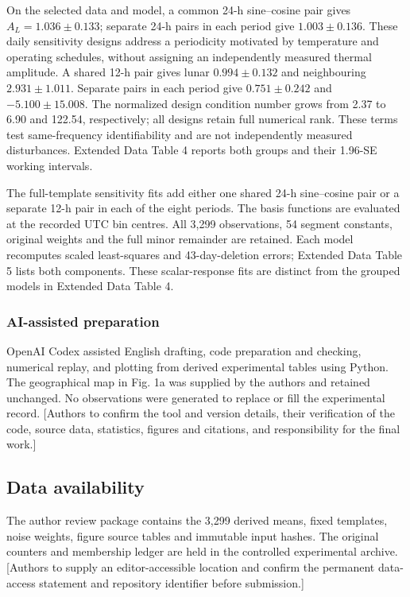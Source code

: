 \documentclass[
  12pt,
  a4paper,
]{article}
\begin{document}
On the selected data and model, a common 24-h sine--cosine pair gives
\(A_L=1.036\pm0.133\); separate 24-h pairs in each period give
\(1.003\pm0.136\). These daily sensitivity designs address a periodicity
motivated by temperature and operating schedules, without assigning an
independently measured thermal amplitude. A shared 12-h pair gives lunar
\(0.994\pm0.132\) and neighbouring \(2.931\pm1.011\). Separate pairs in
each period give \(0.751\pm0.242\) and \(-5.100\pm15.008\). The
normalized design condition number grows from 2.37 to 6.90 and 122.54,
respectively; all designs retain full numerical rank. These terms test
same-frequency identifiability and are not independently measured
disturbances. Extended Data Table 4 reports both groups and their
1.96-SE working intervals.

The full-template sensitivity fits add either one shared 24-h
sine--cosine pair or a separate 12-h pair in each of the eight periods.
The basis functions are evaluated at the recorded UTC bin centres. All
3,299 observations, 54 segment constants, original weights and the full
minor remainder are retained. Each model recomputes scaled least-squares
and 43-day-deletion errors; Extended Data Table 5 lists both components.
These scalar-response fits are distinct from the grouped models in
Extended Data Table 4.

\hypertarget{ai-assisted-preparation}{%
\subsubsection{AI-assisted preparation}\label{ai-assisted-preparation}}

OpenAI Codex assisted English drafting, code preparation and checking,
numerical replay, and plotting from derived experimental tables using
Python. The geographical map in Fig. 1a was supplied by the authors and
retained unchanged. No observations were generated to replace or fill
the experimental record. {[}Authors to confirm the tool and version
details, their verification of the code, source data, statistics,
figures and citations, and responsibility for the final work.{]}

\singlespacing\fontsize{11}{13}\selectfont

\hypertarget{data-availability}{%
\subsection{Data availability}\label{data-availability}}

The author review package contains the 3,299 derived means, fixed
templates, noise weights, figure source tables and immutable input
hashes. The original counters and membership ledger are held in the
controlled experimental archive. {[}Authors to supply an
editor-accessible location and confirm the permanent data-access
statement and repository identifier before submission.{]}
\end{document}
